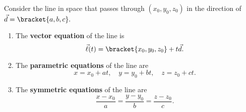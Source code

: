 \begin{definition}\label{def:lines}
Consider the line in space that passes through $(x_0,y_0,z_0)$ in the direction of $\vec d =\bracket{a,b,c}.$
\begin{enumerate}
	\item The \textbf{vector equation} of the line is
	\[\vec \ell(t) = \bracket{x_0,y_0,z_0}+t\vec d.\]
	\item	The \textbf{parametric equations} of the line are
	\[x = x_0+at, \quad y=y_0+bt, \quad z = z_0+ct .\]
	\item	The \textbf{symmetric equations} of the line are
	\[\frac{x-x_0}{a} = \frac{y-y_0}{b}=\frac{z-z_0}{c}.\]
\end{enumerate}
\end{definition}


